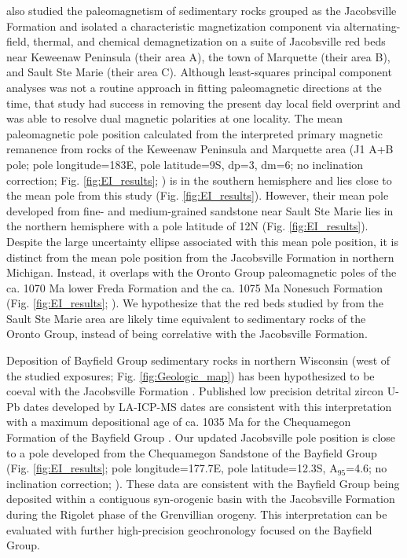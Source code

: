 \documentclass[draft]{agujournal2019}
\begin{document}
 also studied the paleomagnetism of sedimentary rocks grouped as the Jacobsville Formation and isolated a characteristic magnetization component via alternating-field, thermal, and chemical demagnetization on a suite of Jacobsville red beds near Keweenaw Peninsula (their area A), the town of Marquette (their area B), and Sault Ste Marie (their area C). Although least-squares principal component analyses was not a routine approach in fitting paleomagnetic directions at the time, that study had success in removing the present day local field overprint and was able to resolve dual magnetic polarities at one locality. The mean paleomagnetic pole position calculated from the interpreted primary magnetic remanence from rocks of the Keweenaw Peninsula and Marquette area (J1 A+B pole; pole longitude=183\textdegree E, pole latitude=9\textdegree S, dp=3\textdegree, dm=6\textdegree; no inclination correction; Fig. \ref{fig:EI_results}; ) is in the southern hemisphere and lies close to the mean pole from this study (Fig. \ref{fig:EI_results}). However, their mean pole developed from fine- and medium-grained sandstone near Sault Ste Marie lies in the northern hemisphere with a pole latitude of 12\textdegree N (Fig. \ref{fig:EI_results}). Despite the large uncertainty ellipse associated with this mean pole position, it is distinct from the mean pole position from the Jacobsville Formation in northern Michigan. Instead, it overlaps with the Oronto Group paleomagnetic poles of the ca. 1070 Ma lower Freda Formation and the ca. 1075 Ma Nonesuch Formation (Fig. \ref{fig:EI_results}; ). We hypothesize that the red beds studied by  from the Sault Ste Marie area are likely time equivalent to sedimentary rocks of the Oronto Group, instead of being correlative with the Jacobsville Formation. 

Deposition of Bayfield Group sedimentary rocks in northern Wisconsin (west of the studied exposures; Fig. \ref{fig:Geologic_map}) has been hypothesized to be coeval with the Jacobsville Formation \cite{Hamblin1958a, Kalliokoski1982a, Malone2016a}. Published low precision detrital zircon U-Pb dates developed by LA-ICP-MS dates are consistent with this interpretation with a maximum depositional age of ca. 1035 Ma for the Chequamegon Formation of the Bayfield Group \cite{Craddock2013a}. Our updated Jacobsville pole position is close to a pole developed from the Chequamegon Sandstone of the Bayfield Group (Fig. \ref{fig:EI_results}; pole longitude=177.7\textdegree E, pole latitude=12.3\textdegree S, A$_95$=4.6\textdegree; no inclination correction; ). These data are consistent with the Bayfield Group being deposited within a contiguous syn-orogenic basin with the Jacobsville Formation during the Rigolet phase of the Grenvillian orogeny. This interpretation can be evaluated with further high-precision geochronology focused on the Bayfield Group. 
\end{document}
